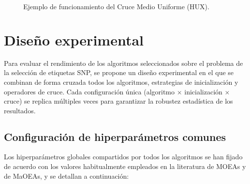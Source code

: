 \begin{itemize}
\begin{figure}[H]
\caption{Ejemplo de funcionamiento del Cruce Medio Uniforme (HUX).}
\label{fig:crossover_hux}
\end{figure}
\end{itemize}

\section{Diseño experimental}

Para evaluar el rendimiento de los algoritmos seleccionados sobre el problema de la selección de etiquetas SNP, se propone un diseño experimental en el que se combinan de forma cruzada todos los algoritmos, estrategias de inicialización y operadores de cruce. Cada configuración única (algoritmo $\times$ inicialización $\times$ cruce) se replica múltiples veces para garantizar la robustez estadística de los resultados.

\subsection{Configuración de hiperparámetros comunes}

Los hiperparámetros globales compartidos por todos los algoritmos se han fijado de acuerdo con los valores habitualmente empleados en la literatura de MOEAs y de MaOEAs, y se detallan a continuación:

